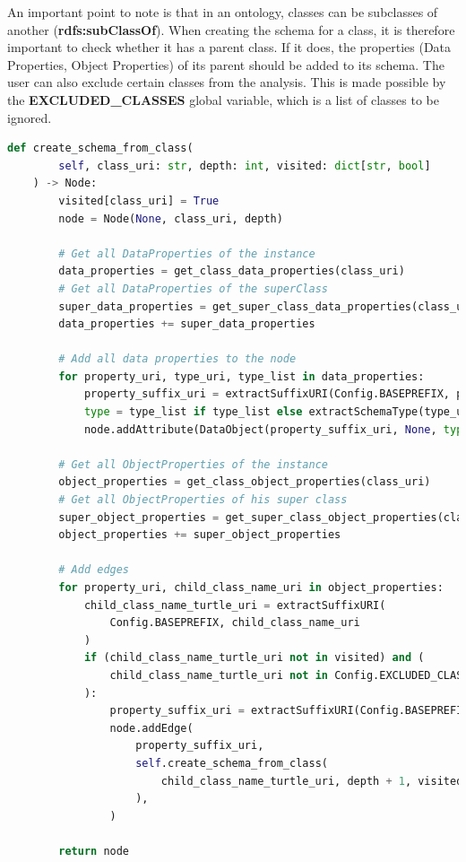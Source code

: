 An important point to note is that in an ontology, classes can be subclasses of another (\textbf{rdfs:subClassOf}). When creating the schema for a class, it is therefore important to check whether it has a parent class. If it does, the properties (Data Properties, Object Properties) of its parent should be added to its schema.
The user can also exclude certain classes from the analysis. This is made possible by the \textbf{EXCLUDED\_CLASSES} global variable, which is a list of classes to be ignored.\\

\begin{lstlisting}[language=Python, caption=Function to create the schema of the ontology, label={lst:create-schema}]
def create_schema_from_class(
        self, class_uri: str, depth: int, visited: dict[str, bool]
    ) -> Node:
        visited[class_uri] = True
        node = Node(None, class_uri, depth)

        # Get all DataProperties of the instance
        data_properties = get_class_data_properties(class_uri)
        # Get all DataProperties of the superClass
        super_data_properties = get_super_class_data_properties(class_uri)
        data_properties += super_data_properties

        # Add all data properties to the node
        for property_uri, type_uri, type_list in data_properties:
            property_suffix_uri = extractSuffixURI(Config.BASEPREFIX, property_uri)
            type = type_list if type_list else extractSchemaType(type_uri)
            node.addAttribute(DataObject(property_suffix_uri, None, type, depth))

        # Get all ObjectProperties of the instance
        object_properties = get_class_object_properties(class_uri)
        # Get all ObjectProperties of his super class
        super_object_properties = get_super_class_object_properties(class_uri)
        object_properties += super_object_properties

        # Add edges
        for property_uri, child_class_name_uri in object_properties:
            child_class_name_turtle_uri = extractSuffixURI(
                Config.BASEPREFIX, child_class_name_uri
            )
            if (child_class_name_turtle_uri not in visited) and (
                child_class_name_turtle_uri not in Config.EXCLUDED_CLASSES
            ):
                property_suffix_uri = extractSuffixURI(Config.BASEPREFIX, property_uri)
                node.addEdge(
                    property_suffix_uri,
                    self.create_schema_from_class(
                        child_class_name_turtle_uri, depth + 1, visited
                    ),
                )

        return node
\end{lstlisting}



